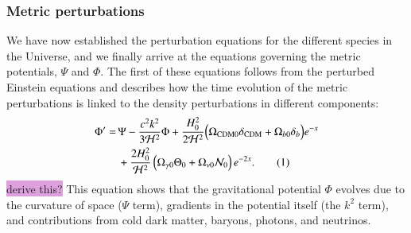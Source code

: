 \documentclass{aa}
\newcommand\numberthis{\addtocounter{equation}{1}\tag{\theequation}}
\numberwithin{equation}{section}
\numberwithin{table}{section}
\numberwithin{figure}{section}
\begin{document}
\subsubsection{Metric perturbations}
We have now established the perturbation equations for the different species in the Universe, and we finally arrive at the equations governing the metric potentials, $\Psi$ and $\Phi$. 
The first of these equations follows from the perturbed Einstein equations and describes how the time evolution of the metric perturbations is linked to the density perturbations in different components:
\begin{align*}
\Phi' =\, &\Psi - \frac{c^2 k^2}{3\mathcal{H}^2} \Phi + \frac{H_0^2}{2\mathcal{H}^2} \Big(\Omega_{\text{CDM}0} \delta_{\text{CDM}} + \Omega_{b0} \delta_b\Big)e^{-x} 
\\
&+ \frac{2H_0^2}{\mathcal{H}^2}\left(\Omega_{\gamma0} \Theta_0 + \Omega_{\nu0} \mathcal{N}_0 \right)e^{-2x}. \numberthis
\end{align*}
\colorbox{Plum}{derive this?} This equation shows that the gravitational potential $\Phi$ evolves due to the curvature of space ($\Psi$ term), gradients in the potential itself (the $k^2$ term), and contributions from cold dark matter, baryons, photons, and neutrinos. 
\end{document}
